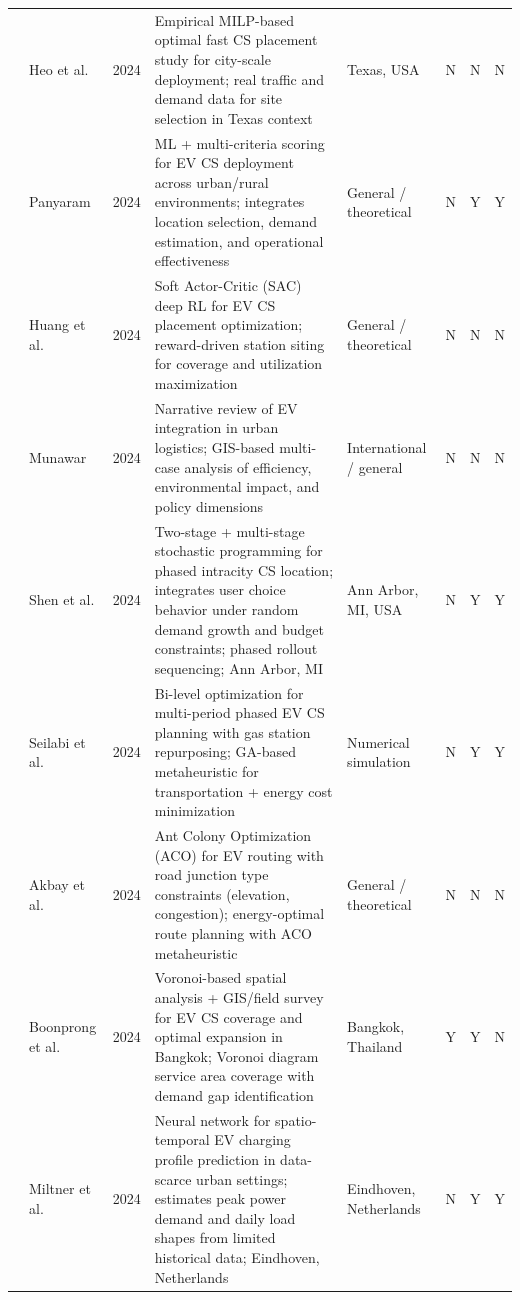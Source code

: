 \documentclass[letterpaper, 12pt, oneside, doublespacing]{Thesis}
\begin{document}
\begin{longtable}{L{0.9cm} L{1.8cm} L{0.7cm} L{2.5cm} L{2.1cm} L{0.7cm} L{0.7cm} L{0.7cm}}
\cite{optimal_planning_2024} & Heo et al. & 2024 & Empirical MILP-based optimal fast CS placement study for city-scale deployment; real traffic and demand data for site selection in Texas context & Texas, USA & N & N & N \\
\cite{optimization_strategies_2024} & Panyaram & 2024 & ML + multi-criteria scoring for EV CS deployment across urban/rural environments; integrates location selection, demand estimation, and operational effectiveness & General {\slash} theoretical & N & Y & Y \\
\cite{optimizing_ev_2024} & Huang et al. & 2024 & Soft Actor-Critic (SAC) deep RL for EV CS placement optimization; reward-driven station siting for coverage and utilization maximization & General {\slash} theoretical & N & N & N \\
\cite{optimizing_urban_2024} & Munawar & 2024 & Narrative review of EV integration in urban logistics; GIS-based multi-case analysis of efficiency, environmental impact, and policy dimensions & International {\slash} general & N & N & N \\
\cite{sequential_charging_2024} & Shen et al. & 2024 & Two-stage + multi-stage stochastic programming for phased intracity CS location; integrates user choice behavior under random demand growth and budget constraints; phased rollout sequencing; Ann Arbor, MI & Ann Arbor, MI, USA & N & Y & Y \\
\cite{sustainable_planning_2024} & Seilabi et al. & 2024 & Bi-level optimization for multi-period phased EV CS planning with gas station repurposing; GA-based metaheuristic for transportation + energy cost minimization & Numerical simulation & N & Y & Y \\
\cite{the_electric_2024} & Akbay et al. & 2024 & Ant Colony Optimization (ACO) for EV routing with road junction type constraints (elevation, congestion); energy-optimal route planning with ACO metaheuristic & General {\slash} theoretical & N & N & N \\
\cite{towards_sustainable_2024} & Boonprong et al. & 2024 & Voronoi-based spatial analysis + GIS/field survey for EV CS coverage and optimal expansion in Bangkok; Voronoi diagram service area coverage with demand gap identification & Bangkok, Thailand & Y & Y & N \\
\cite{towards_using_2024} & Miltner et al. & 2024 & Neural network for spatio-temporal EV charging profile prediction in data-scarce urban settings; estimates peak power demand and daily load shapes from limited historical data; Eindhoven, Netherlands & Eindhoven, Netherlands & N & Y & Y \\

\end{longtable}
\end{document}
